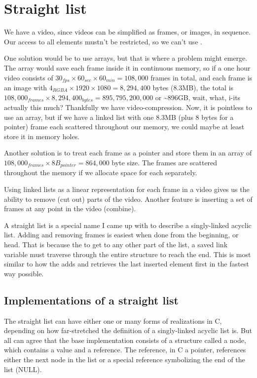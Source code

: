 \chapter{Straight list} \label{ch:straight-list}

We have a video, since videos can be simplified as frames, or images, in sequence. Our access to all elements mustn't be restricted, so we can't use . 

One solution would be to use arrays, but that is where a problem might emerge. The array would save each frame inside it in continuous memory, so if a one hour video consists of \(30_{fps} \times 60_{sec} \times 60_{min} = 108,000\) frames in total, and each frame is an image with \(4_{RGBA} \times 1920 \times 1080 = 8,294,400\) bytes (8.3MB), the total is \(108,000_{frames} \times 8,294,400_{bytes} = 895,795,200,000\) or \textasciitilde 896GB, wait, what, i-its actually this much? Thankfully we have video-compression. Now, it is pointless to use an array, but if we have a linked list with one 8.3MB (plus 8 bytes for a pointer) frame each scattered throughout our memory, we could maybe at least store it in memory holes. 

Another solution is to treat each frame as a pointer and store them in an array of \(108,000_{frames} \times 8B_{pointer} = 864,000\) byte size. The frames are scattered throughout the memory if we allocate space for each separately.

Using linked lists as a linear representation for each frame in a video gives us the ability to remove (cut out) parts of the video. Another feature is inserting a set of frames at any point in the video (combine).

A straight list is a special name I came up with to describe a singly-linked acyclic list. Adding and removing frames is easiest when done from the beginning, or head. That is because the to get to any other part of the list, a saved link variable must traverse through the entire structure to reach the end. This is most similar to how the  adds and retrieves the last inserted element first in the fastest way possible.

\section{Implementations of a straight list}

The straight list can have either one or many forms of realizations in C, depending on how far-stretched the definition of a singly-linked acyclic list is. But all can agree that the base implementation consists of a structure called a node, which contains a value and a reference. The reference, in C a pointer, references either the next node in the list or a special reference symbolizing the end of the list (NULL). 


